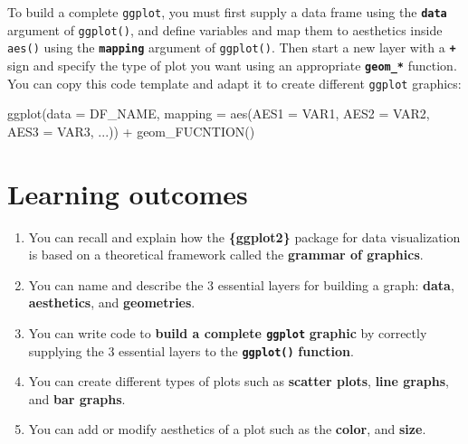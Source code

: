 \documentclass[
  letterpaper,
  DIV=11,
  numbers=noendperiod]{scrreprt}
\newenvironment{Shaded}{\begin{snugshade}}{\end{snugshade}}
\newcommand{\AttributeTok}[1]{\textcolor[rgb]{0.40,0.45,0.13}{#1}}
\newcommand{\FunctionTok}[1]{\textcolor[rgb]{0.28,0.35,0.67}{#1}}
\newcommand{\NormalTok}[1]{\textcolor[rgb]{0.00,0.23,0.31}{#1}}
\newcommand{\SpecialCharTok}[1]{\textcolor[rgb]{0.37,0.37,0.37}{#1}}
\begin{document}
\begin{tcolorbox}[enhanced jigsaw, colframe=quarto-callout-note-color-frame, rightrule=.15mm, opacityback=0, breakable, coltitle=black, colbacktitle=quarto-callout-note-color!10!white, bottomrule=.15mm, leftrule=.75mm, toprule=.15mm, arc=.35mm, bottomtitle=1mm, colback=white, left=2mm, opacitybacktitle=0.6, titlerule=0mm, title=\textcolor{quarto-callout-note-color}{\faInfo}\hspace{0.5em}{Recap}, toptitle=1mm]

To build a complete \texttt{ggplot}, you must first supply a data frame
using the \textbf{\texttt{data}} argument of \texttt{ggplot()}, and
define variables and map them to aesthetics inside \texttt{aes()} using
the \textbf{\texttt{mapping}} argument of \texttt{ggplot()}. Then start
a new layer with a \textbf{\texttt{+}} sign and specify the type of plot
you want using an appropriate \textbf{\texttt{geom\_*}} function. You
can copy this code template and adapt it to create different
\texttt{ggplot} graphics:

\begin{Shaded}
\begin{Highlighting}[]
\FunctionTok{ggplot}\NormalTok{(}\AttributeTok{data =}\NormalTok{ DF\_NAME,}
       \AttributeTok{mapping =} \FunctionTok{aes}\NormalTok{(}\AttributeTok{AES1 =}\NormalTok{ VAR1,}
                     \AttributeTok{AES2 =}\NormalTok{ VAR2, }
                     \AttributeTok{AES3 =}\NormalTok{ VAR3, }
\NormalTok{                     ...)) }\SpecialCharTok{+}
  \FunctionTok{geom\_FUCNTION}\NormalTok{()}
\end{Highlighting}
\end{Shaded}

\end{tcolorbox}

\hypertarget{learning-outcomes}{%
\section{Learning outcomes}\label{learning-outcomes}}

\begin{enumerate}
\def\labelenumi{\arabic{enumi}.}
\item
  You can recall and explain how the \textbf{\{ggplot2\}} package for
  data visualization is based on a theoretical framework called the
  \textbf{grammar of graphics}.
\item
  You can name and describe the 3 essential layers for building a graph:
  \textbf{data}, \textbf{aesthetics}, and \textbf{geometries}.
\item
  You can write code to \textbf{build a complete \texttt{ggplot}}
  \textbf{graphic} by correctly supplying the 3 essential layers to the
  \textbf{\texttt{ggplot()}} \textbf{function}.
\item
  You can create different types of plots such as \textbf{scatter
  plots}, \textbf{line graphs}, and \textbf{bar graphs}.
\item
  You can add or modify aesthetics of a plot such as the \textbf{color},
  and \textbf{size}.
\end{enumerate}
\end{document}
